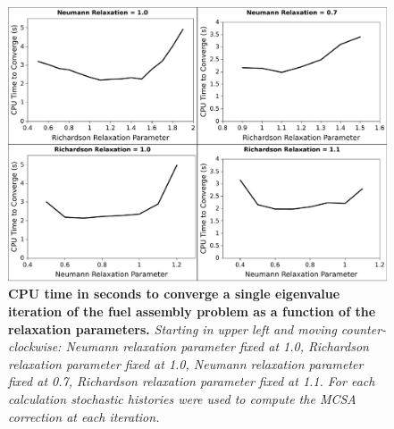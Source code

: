 \begin{figure}[t!]
  \begin{center}
    \includegraphics[width=6in]{chapters/spn_equations/relax_time.pdf}
  \end{center}
  \caption{\textbf{CPU time in seconds to converge a single eigenvalue
      iteration of the fuel assembly problem as a function of the
      relaxation parameters.} \textit{Starting in upper left and
      moving counter-clockwise: Neumann relaxation parameter fixed at
      1.0, Richardson relaxation parameter fixed at 1.0, Neumann
      relaxation parameter fixed at 0.7, Richardson relaxation
      parameter fixed at 1.1. For each calculation 
      stochastic histories were used to compute the MCSA correction at
      each iteration.}}
  \label{fig:relax_time}
\end{figure}

